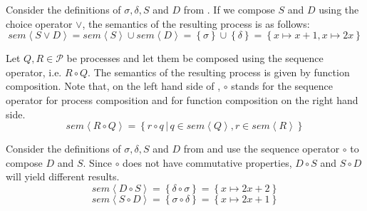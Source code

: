 \begin{example}
\label{exp:sem_chice}
Consider the definitions of $\sigma, \delta, S$ and $D$ from . If we compose $S$ and $D$ using the choice operator $\vee$, the semantics of the resulting process is as follows:
  \begin{equation}
    sem \left\langle S \vee D \right\rangle = sem \left\langle S \right\rangle \cup sem \left\langle D \right\rangle = \left\{ \sigma \right\} \cup \left\{ \delta \right\} = \left\{ x \mapsto x+1, x \mapsto 2x \right\}
  \end{equation}
  \hfill\qedsymbol
\end{example}


\begin{definition}
\label{def:sem_sequence}
Let $Q, R \in \mathcal{P}$ be processes and let them be composed using the sequence operator, i.e. $R \circ Q$. The semantics of the resulting process is given by function composition. Note that, on the left hand side of , $\circ$ stands for the sequence operator for process composition and for function composition on the right hand side.
  \begin{equation}
    \label{eqn:sem_sequence}
    sem \left\langle R \circ Q \right\rangle = \left\{ r \circ q \,|\, q \in sem \left\langle Q \right\rangle, r \in sem \left\langle R \right\rangle \right\}
  \end{equation}
  \hfill\qedsymbol
\end{definition}

\begin{example}
\label{exp:sem_sequence}
Consider the definitions of $\sigma, \delta, S$ and $D$ from  and use the sequence operator $\circ$ to compose $D$ and $S$. Since $\circ$ does not have commutative properties, $D \circ S$ and $S \circ D$ will yield different results.
  \begin{equation}
    sem \left\langle D \circ S \right\rangle = \left\{ \delta \circ \sigma \right\} = \left\{ x \mapsto 2x+2 \right\}
  \end{equation}
  \begin{equation}
    sem \left\langle S \circ D \right\rangle = \left\{ \sigma \circ \delta \right\} = \left\{ x \mapsto 2x+1 \right\}
  \end{equation}
  \hfill\qedsymbol
\end{example}


